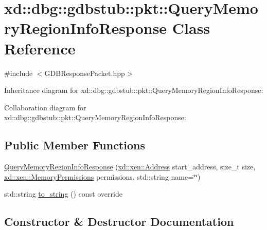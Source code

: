 \hypertarget{classxd_1_1dbg_1_1gdbstub_1_1pkt_1_1_query_memory_region_info_response}{}\section{xd\+:\+:dbg\+:\+:gdbstub\+:\+:pkt\+:\+:Query\+Memory\+Region\+Info\+Response Class Reference}
\label{classxd_1_1dbg_1_1gdbstub_1_1pkt_1_1_query_memory_region_info_response}


{\ttfamily \#include $<$G\+D\+B\+Response\+Packet.\+hpp$>$}



Inheritance diagram for xd\+:\+:dbg\+:\+:gdbstub\+:\+:pkt\+:\+:Query\+Memory\+Region\+Info\+Response\+:


Collaboration diagram for xd\+:\+:dbg\+:\+:gdbstub\+:\+:pkt\+:\+:Query\+Memory\+Region\+Info\+Response\+:
\subsection*{Public Member Functions}
\begin{DoxyCompactItemize}
\item 
\mbox{\hyperlink{classxd_1_1dbg_1_1gdbstub_1_1pkt_1_1_query_memory_region_info_response_a63aabbee8c0387d39d43bd23ddcc976e}{Query\+Memory\+Region\+Info\+Response}} (\mbox{\hyperlink{namespacexd_1_1xen_a94a8d6c9448e8330c771c100dba152c3}{xd\+::xen\+::\+Address}} start\+\_\+address, size\+\_\+t size, \mbox{\hyperlink{structxd_1_1xen_1_1_memory_permissions}{xd\+::xen\+::\+Memory\+Permissions}} permissions, std\+::string name=\char`\"{}\char`\"{})
\item 
std\+::string \mbox{\hyperlink{classxd_1_1dbg_1_1gdbstub_1_1pkt_1_1_query_memory_region_info_response_a0206002c51a03e5782816ff2f1edbfad}{to\+\_\+string}} () const override
\end{DoxyCompactItemize}


\subsection{Constructor \& Destructor Documentation}
\mbox{\label{classxd_1_1dbg_1_1gdbstub_1_1pkt_1_1_query_memory_region_info_response_a63aabbee8c0387d39d43bd23ddcc976e}} 
